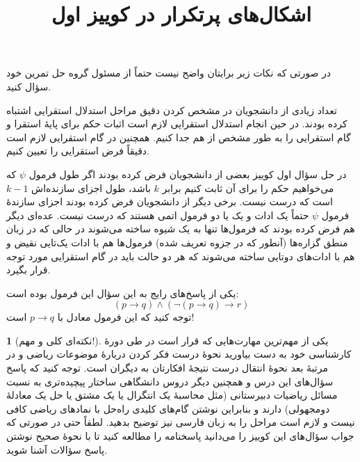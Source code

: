 \documentclass[12pt]{article}
\theoremstyle{definition}
\theoremstyle{named}
\newtheorem*{namedtheorem}{}
\begin{document}
\title{اشکال‌های پرتکرار در کوییز اول}
\author{}
\date{}

\maketitle

\vspace{-2.5cm}

\vspace{0.5cm}
در صورتی که نکات زیر برایتان واضح نیست حتماً از مسئول گروه حل تمرین خود سؤال کنید.

\exc
تعداد زیادی از دانشجویان در مشخص کردن دقیق مراحل استدلال استقرایی اشتباه کرده بودند. در حین انجام استدلال استقرایی لازم است اثبات حکم برای پایهٔ استقرا و گام استقرایی را به طور مشخص از هم جدا کنیم. همچنین در گام استقرایی لازم است دقیقاً فرض استقرایی را تعیین کنیم.


در حل سؤال اول کوییز بعضی از دانشجویان فرض کرده بودند اگر طول فرمول $\psi$
که می‌خواهیم حکم را برای آن ثابت کنیم برابر
$k$
باشد، طول اجزای سازنده‌اش
$k-1$
است که درست نیست. برخی دیگر از دانشجویان فرض کرده بودند اجزای سازندهٔ فرمول
$\psi$
حتماً یک ادات و یک یا دو فرمول اتمی هستند که درست نیست. عده‌ای دیگر هم فرض کرده بودند که فرمول‌ها تنها به یک شیوه ساخته می‌شوند در حالی که در زبان منطق گزاره‌ها (آنطور که در جزوه تعریف شده)
فرمول‌ها هم با ادات یک‌تایی نقیض و هم با ادات‌های دوتایی ساخته می‌شوند که هر دو حالت باید در گام استقرایی مورد توجه قرار بگیرد. 

\exc
یکی از پاسخ‌های رایج به این سؤال این فرمول بوده است:
$$(p\to q)\wedge(\neg(p\to q)\to r)$$
توجه کنید که این فرمول معادل با
$p\to q$
است!

\begin{namedtheorem}[نکته‌ای کلی و مهم!]
    یکی از مهم‌ترین مهارت‌هایی که قرار است در طی دورهٔ کارشناسی خود به دست بیاورید نحوهٔ درست فکر کردن دربارهٔ موضوعات ریاضی و در مرتبهٔ بعد نحوهٔ انتقال درست نتیجهٔ افکارتان به دیگران است. توجه کنید که پاسخ سؤال‌های این درس و همچنین دیگر دروس دانشگاهی ساختار پیچیده‌تری به نسبت مسائل ریاضیات دبیرستانی
    (مثل محاسبهٔ یک انتگرال یا یک مشتق یا حل یک معادلهٔ دومجهولی)
    دارند و بنابراین نوشتن گام‌های کلیدی راه‌حل با نمادهای ریاضی کافی نیست و لازم است مراحل را به زبان فارسی نیز توضیح بدهید. لطفاً حتی در صورتی که جواب سؤال‌های این کوییز را می‌دانید پاسخنامه را مطالعه کنید تا با نحوهٔ صحیح نوشتن پاسخ سؤالات آشنا شوید.
\end{namedtheorem}
\end{document}

